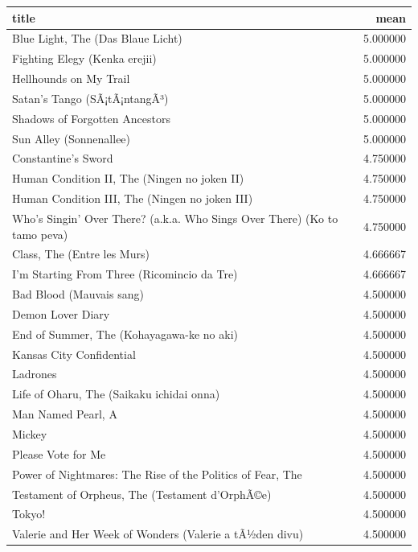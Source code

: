 \documentclass[
]{article}
\begin{document}
\begin{table}
\centering\begingroup\fontsize{10}{12}\selectfont

\begin{tabular}{l|r}
\hline
title & mean\\
\hline
Blue Light, The (Das Blaue Licht) & 5.000000\\
\hline
Fighting Elegy (Kenka erejii) & 5.000000\\
\hline
Hellhounds on My Trail & 5.000000\\
\hline
Satan's Tango (SÃ¡tÃ¡ntangÃ³) & 5.000000\\
\hline
Shadows of Forgotten Ancestors & 5.000000\\
\hline
Sun Alley (Sonnenallee) & 5.000000\\
\hline
Constantine's Sword & 4.750000\\
\hline
Human Condition II, The (Ningen no joken II) & 4.750000\\
\hline
Human Condition III, The (Ningen no joken III) & 4.750000\\
\hline
Who's Singin' Over There? (a.k.a. Who Sings Over There) (Ko to tamo peva) & 4.750000\\
\hline
Class, The (Entre les Murs) & 4.666667\\
\hline
I'm Starting From Three (Ricomincio da Tre) & 4.666667\\
\hline
Bad Blood (Mauvais sang) & 4.500000\\
\hline
Demon Lover Diary & 4.500000\\
\hline
End of Summer, The (Kohayagawa-ke no aki) & 4.500000\\
\hline
Kansas City Confidential & 4.500000\\
\hline
Ladrones & 4.500000\\
\hline
Life of Oharu, The (Saikaku ichidai onna) & 4.500000\\
\hline
Man Named Pearl, A & 4.500000\\
\hline
Mickey & 4.500000\\
\hline
Please Vote for Me & 4.500000\\
\hline
Power of Nightmares: The Rise of the Politics of Fear, The & 4.500000\\
\hline
Testament of Orpheus, The (Testament d'OrphÃ©e) & 4.500000\\
\hline
Tokyo! & 4.500000\\
\hline
Valerie and Her Week of Wonders (Valerie a tÃ½den divu) & 4.500000\\
\hline
\end{tabular}
\endgroup{}
\end{table}
\end{document}
